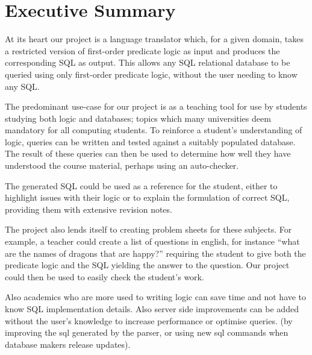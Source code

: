 \documentclass[a4paper, 11pt]{article}
\begin{document}
\renewcommand{\contentsname}{\huge Contents \vspace{1cm}}
\tableofcontents
\clearpage

\setlength{\parskip}{0.3cm} \setlength{\parindent}{0cm}

\section{Executive Summary}

  At its heart our project is a language translator which, for a given domain,
  takes a restricted version of first-order predicate logic as input and
  produces the corresponding SQL as output. This allows any SQL relational
  database to be queried using only first-order predicate logic, without the
  user needing to know any SQL.

  The predominant use-case for our project is as a teaching tool for use by
  students studying both logic and databases; topics which
  many universities deem mandatory for all computing students. To
  reinforce a student's understanding of logic, queries can be written and
  tested against a suitably populated database. The result of these queries
  can then be used to determine how well they have understood the course
  material, perhaps using an auto-checker.

  The generated SQL could be used as a reference for the student, either to
  highlight issues with their logic or to explain the formulation of correct
  SQL, providing them with extensive revision notes.

  The project also lends itself to creating problem sheets for these subjects.
  For example, a teacher could create a list of questions in english, for instance
  ``what are the names of dragons that are happy?'' requiring the student to
  give both the predicate logic and the SQL yielding the answer to the
  question. Our project could then be used to easily check the student's work.

  Also academics who are more used to writing logic can save time and not have
  to know SQL implementation details. Also server side improvements can be added
  without the user's knowledge to increase performance or optimise queries. (by
  improving the sql generated by the parser, or using new sql commands when
  database makers release updates).
\end{document}
